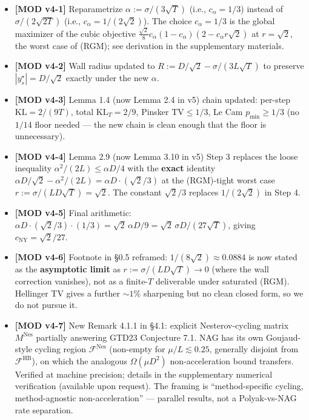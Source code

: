 \documentclass[11pt,a4paper]{article}
\theoremstyle{plain}
\theoremstyle{definition}
\theoremstyle{remark}
\newcommand{\KL}{\mathrm{KL}}
\newcommand{\TV}{\mathrm{TV}}
\newcommand{\F}{\mathcal{F}}
\begin{document}
\begin{itemize}[leftmargin=*]
\item \textbf{[MOD v4-1]} Reparametrize $\alpha := \sigma/(3\sqrt T)$ (i.e., $c_\alpha = 1/3$) instead of $\sigma/(2\sqrt{2T})$ (i.e., $c_\alpha = 1/(2\sqrt 2)$). The choice $c_\alpha = 1/3$ is the global maximizer of the cubic objective $\frac{\sqrt 2}{8}c_\alpha(1-c_\alpha)(2 - c_\alpha r\sqrt 2)$ at $r = \sqrt 2$, the worst case of (RGM); see derivation in the supplementary materials.
\item \textbf{[MOD v4-2]} Wall radius updated to $R := D/\sqrt 2 - \sigma/(3L\sqrt T)$ to preserve $|y^\star_s| = D/\sqrt 2$ exactly under the new $\alpha$.
\item \textbf{[MOD v4-3]} Lemma 1.4 (now Lemma 2.4 in v5) chain updated: per-step $\KL = 2/(9T)$, total $\KL_T = 2/9$, Pinsker $\TV \le 1/3$, Le Cam $p_{\min} \ge 1/3$ (no $1/14$ floor needed --- the new chain is clean enough that the floor is unnecessary).
\item \textbf{[MOD v4-4]} Lemma 2.9 (now Lemma 3.10 in v5) Step 3 replaces the loose inequality $\alpha^2/(2L) \le \alpha D/4$ with the \textbf{exact} identity $\alpha D/\sqrt 2 - \alpha^2/(2L) = \alpha D \cdot (\sqrt 2/3)$ at the (RGM)-tight worst case $r := \sigma/(LD\sqrt T) = \sqrt 2$. The constant $\sqrt 2/3$ replaces $1/(2\sqrt 2)$ in Step 4.
\item \textbf{[MOD v4-5]} Final arithmetic: $\alpha D \cdot (\sqrt 2/3) \cdot (1/3) = \sqrt 2\, \alpha D/9 = \sqrt 2\, \sigma D/(27\sqrt T)$, giving $c_{\mathrm{NY}} = \sqrt 2/27$.
\item \textbf{[MOD v4-6]} Footnote in \S0.5 reframed: $1/(8\sqrt 2) \approx 0.0884$ is now stated as the \textbf{asymptotic limit} as $r := \sigma/(LD\sqrt T) \to 0$ (where the wall correction vanishes), not as a finite-$T$ deliverable under saturated (RGM). Hellinger TV gives a further $\sim 1\%$ sharpening but no clean closed form, so we do not pursue it.
\item \textbf{[MOD v4-7]} New Remark 4.1.1 in \S4.1: explicit Nesterov-cycling matrix $M^{\mathrm{Nes}}$ partially answering GTD23 Conjecture 7.1. NAG has its own Goujaud-style cycling region $\F^{\mathrm{Nes}}$ (non-empty for $\mu/L \lesssim 0.25$, generally disjoint from $\F^{\mathrm{HB}}$), on which the analogous $\Omega(\mu D^2)$ non-acceleration bound transfers. Verified at machine precision; details in the supplementary numerical verification (available upon request). The framing is ``method-specific cycling, method-agnostic non-acceleration'' --- parallel results, not a Polyak-vs-NAG rate separation.
\end{itemize}
\end{document}
